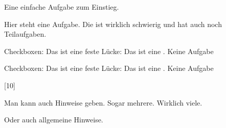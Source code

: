 \documentclass[a4paper]{scrartcl}
\begin{document}
    \begin{aufgabe}[points=2,bonus-points=1]
        Eine einfache Aufgabe zum Einstieg.
    \end{aufgabe}
    \begin{aufgabe}
        Hier steht eine Aufgabe. Die ist wirklich schwierig und hat auch noch Teilaufgaben.
        \begin{teilaufgaben}
            \teilaufgabe Checkboxen: \chb\chb\chb*\chb\chb*
            \teilaufgabe Das ist eine feste Lücke: \luecke[style=\uwave{#1}]{2cm}
            \teilaufgabe Das ist eine .
            \teilaufgabe Keine Aufgabe
        \end{teilaufgaben}
        \begin{loesung}
            \begin{teilaufgaben}
                \teilaufgabe Checkboxen: \chb\chb\chb*\chb\chb*
                \teilaufgabe Das ist eine feste Lücke: \luecke[style=\uwave{#1}]{2cm}
                \teilaufgabe Das ist eine .
                \teilaufgabe Keine Aufgabe
            \end{teilaufgaben}
        \end{loesung}
        \begin{erwartungen}
            [10]
        \end{erwartungen}
        \begin{bearbeitungshinweis}
            \begin{teilaufgaben}
                \teilaufgabe Man kann auch Hinweise geben.
                \teilaufgabe Sogar mehrere.
                \teilaufgabeOhneLoesung
                \teilaufgabe Wirklich viele.
            \end{teilaufgaben}
            Oder auch allgemeine Hinweise.
        \end{bearbeitungshinweis}
    \end{aufgabe}
\end{document}
